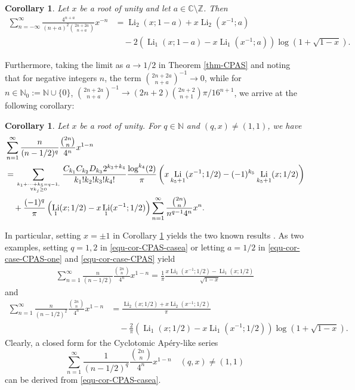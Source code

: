 \documentclass[11pt]{article}
\DeclareMathOperator{\Li}{Li}
\def\N{\mathbb{N}}
\def\Z{\mathbb{Z}}
\theoremstyle{plain}
\newtheorem{cor}[thm]{Corollary}
\theoremstyle{definition}
\begin{document}
\begin{cor} Let $x$ be a root of unity and let $a\in \mathbb{C}\setminus \Z$. Then
\begin{align}\label{equ-cor-case-CPAS}
\sum_{n=-\infty}^\infty \frac{4^{n+a}}{(n+a)^2\binom{2n+2a}{n+a}}x^{-n}&=\Li_2(x;1-a)+x\Li_2(x^{-1};a)\nonumber\\
&\quad-2(\Li_1(x;1-a)-x\Li_1(x^{-1};a))\log(1+\sqrt{1-x}).
\end{align}
\end{cor}
Furthermore, taking the limit as $a\rightarrow 1/2$ in Theorem \ref{thm-CPAS} and noting that for negative integers $n$, the term $\binom{2n+2a}{n+a}^{-1}\rightarrow 0$, while for $n\in \N_0:=\N\cup\{0\}$, $\binom{2n+2a}{n+a}^{-1}\rightarrow (2n+2)\binom{2n+2}{n+1} \pi/16^{n+1}$, we arrive at the following corollary:
\begin{cor}\label{cor-CPAS-casea} Let $x$ be a root of unity. For $q\in\N$ and $(q,x)\neq (1,1)$, we have
\begin{align}\label{equ-cor-CPAS-casea}
&\sum_{n=1}^\infty \frac{n}{(n-1/2)^q}\frac{\binom{2n}{n}}{4^n}x^{1-n}\nonumber\\
&=\sum_{k_1+\cdots+k_5=q-1,\atop \forall k_j\geq 0} \frac{C_{k_1}C_{k_2}D_{k_3}2^{k_3+k_4}}{k_1!k_2!k_3!k_4!}\frac{\log^{k_4}(2)}{\pi}\left(x\Li_{k_5+1}(x^{-1};1/2)-(-1)^{k_5}\Li_{k_5+1}(x;1/2)\right)\nonumber\\
&\quad+\frac{(-1)^q}{\pi}\left(\Li_1(x;1/2)-x\Li_1(x^{-1};1/2)\right) \sum_{n=1}^\infty \frac{\binom{2n}{n}}{n^{q-1}4^n}x^n.
\end{align}
\end{cor}
In particular, setting $x=\pm 1$ in Corollary \ref{cor-CPAS-casea} yields the two known results \cite[Theorems 3.4 and 3.5]{WLX2022}. As two examples, setting $q=1,2$ in \eqref{equ-cor-CPAS-casea} or letting $a=1/2$ in \eqref{equ-cor-case-CPAS-one} and \eqref{equ-cor-case-CPAS} yield
\begin{align}
\sum_{n=1}^\infty \frac{n}{(n-1/2)}\frac{\binom{2n}{n}}{4^n}x^{1-n}=\frac{1}{\pi} \frac{x\Li_1(x^{-1};1/2)-\Li_1(x;1/2)}{\sqrt{1-x}}
\end{align}
and
\begin{align}
\sum_{n=1}^\infty \frac{n}{(n-1/2)^2}\frac{\binom{2n}{n}}{4^n}x^{1-n}&=\frac{\Li_2(x;1/2)+x\Li_2(x^{-1};1/2)}{\pi}\nonumber\\
&\quad-\frac{2}{\pi}(\Li_1(x;1/2)-x\Li_1(x^{-1};1/2))\log(1+\sqrt{1-x}).
\end{align}
Clearly, a closed form for the Cyclotomic Ap\'ery-like series \[\sum_{n=1}^\infty \frac{1}{(n-1/2)^q}\frac{\binom{2n}{n}}{4^n}x^{1-n}\quad (q,x)\neq (1,1)\] can be derived from \eqref{equ-cor-CPAS-casea}.
\end{document}

